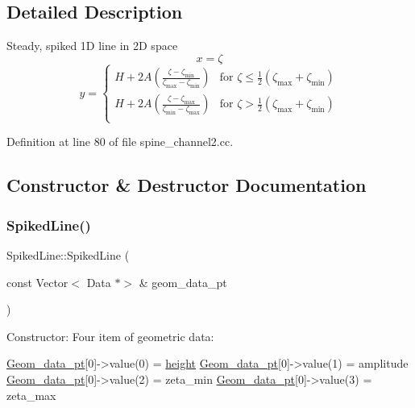 \subsection{Detailed Description}
Steady, spiked 1D line in 2D space \[ x = \zeta \] \[ y = \left\{ \begin{array}{cl} H + 2A\left(\frac{\zeta - \zeta_{\mbox{min}}} {\zeta_{\mbox{max}} - \zeta_{\mbox{min}}}\right) & \mbox{for } \zeta \leq \frac{1}{2} \left(\zeta_{\mbox{max}} + \zeta_{\mbox{min}}\right)\\H + 2A\left(\frac{\zeta - \zeta_{\mbox{max}}} {\zeta_{\mbox{min}} - \zeta_{\mbox{max}}}\right) & \mbox{for } \zeta > \frac{1}{2} \left(\zeta_{\mbox{max}} + \zeta_{\mbox{min}}\right)\\ \end{array} \right.\] 

Definition at line 80 of file spine\+\_\+channel2.\+cc.



\subsection{Constructor \& Destructor Documentation}
\mbox{\label{classSpikedLine_a79ca76b80aebb0b32f63c125aee9d04d}} 
\subsubsection{\texorpdfstring{Spiked\+Line()}{SpikedLine()}\hspace{0.1cm}{\footnotesize\ttfamily [1/2]}}
{\footnotesize\ttfamily Spiked\+Line\+::\+Spiked\+Line (\begin{DoxyParamCaption}\item[{const Vector$<$ Data $\ast$$>$ \&}]{geom\+\_\+data\+\_\+pt }\end{DoxyParamCaption})\hspace{0.3cm}{\ttfamily [inline]}}



Constructor\+: Four item of geometric data\+: 


\begin{DoxyCode}
\hyperlink{classSpikedLine_a62f6dbf18fd631df474089e41ae7afeb}{Geom\_data\_pt}[0]->value(0) = \hyperlink{namespaceGlobal__Physical__Variables_aad3f0468efff43e7f235a64c27d3acf2}{height}
\hyperlink{classSpikedLine_a62f6dbf18fd631df474089e41ae7afeb}{Geom\_data\_pt}[0]->value(1) = amplitude
\hyperlink{classSpikedLine_a62f6dbf18fd631df474089e41ae7afeb}{Geom\_data\_pt}[0]->value(2) = zeta\_min
\hyperlink{classSpikedLine_a62f6dbf18fd631df474089e41ae7afeb}{Geom\_data\_pt}[0]->value(3) = zeta\_max
\end{DoxyCode}
 

